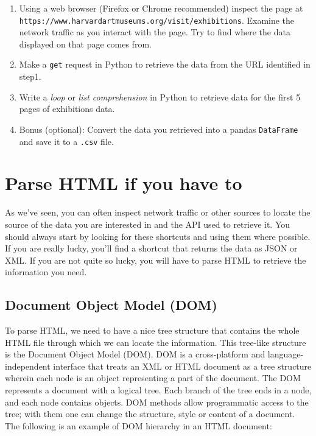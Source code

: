 \documentclass[]{book}
\providecommand{\tightlist}{%
  \setlength{\itemsep}{0pt}\setlength{\parskip}{0pt}}
\begin{document}
\begin{enumerate}
\def\labelenumi{\arabic{enumi}.}
\tightlist
\item
  Using a web browser (Firefox or Chrome recommended) inspect the
  page at \texttt{https://www.harvardartmuseums.org/visit/exhibitions}. Examine
  the network traffic as you interact with the page. Try to find
  where the data displayed on that page comes from.
\item
  Make a \texttt{get} request in Python to retrieve the data from the URL
  identified in step1.
\item
  Write a \emph{loop} or \emph{list comprehension} in Python to retrieve data
  for the first 5 pages of exhibitions data.
\item
  Bonus (optional): Convert the data you retrieved into a pandas
  \texttt{DataFrame} and save it to a \texttt{.csv} file.
\end{enumerate}

\hypertarget{parse-html-if-you-have-to}{%
\section{Parse HTML if you have to}\label{parse-html-if-you-have-to}}

As we've seen, you can often inspect network traffic or other sources
to locate the source of the data you are interested in and the API
used to retrieve it. You should always start by looking for these
shortcuts and using them where possible. If you are really lucky,
you'll find a shortcut that returns the data as JSON or XML. If you
are not quite so lucky, you will have to parse HTML to retrieve the
information you need.

\hypertarget{document-object-model-dom}{%
\subsection{Document Object Model (DOM)}\label{document-object-model-dom}}

To parse HTML, we need to have a nice tree structure that contains the whole HTML file through which we can locate the information. This tree-like structure is the Document Object Model (DOM). DOM is a cross-platform and language-independent interface that treats an XML or HTML document as a tree structure wherein each node is an object representing a part of the document. The DOM represents a document with a logical tree. Each branch of the tree ends in a node, and each node contains objects. DOM methods allow programmatic access to the tree; with them one can change the structure, style or content of a document. The following is an example of DOM hierarchy in an HTML document:
\end{document}
